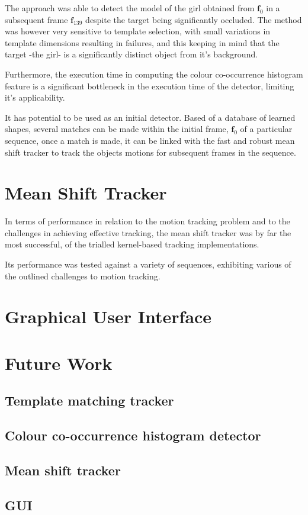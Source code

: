 The approach was able to detect the model of the girl obtained from
$\mathbf{f}_0$ in a subsequent frame $\mathbf{f}_{139}$ despite the target being
significantly occluded. 
The method was however very sensitive to template selection, with small
variations in template dimensions resulting in failures, and this keeping in
mind that the target -the girl- is a significantly distinct object from it's
background. 

Furthermore, the execution time in computing the colour co-occurrence histogram
feature is a significant bottleneck in the execution time of the detector,
limiting it's applicability. 

It has potential to be used as an initial detector. Based of a database of
learned shapes, several matches can be made within the initial frame,
$\mathbf{f}_0$ of a particular sequence, once a match is made, it can be linked
with the fast and robust mean shift tracker to track the objects motions for
subsequent frames in the sequence. 

\section{Mean Shift Tracker}
In terms of performance in relation to the motion tracking problem and to the
challenges in achieving effective tracking, the mean shift tracker was by far
the most successful, of the trialled kernel-based tracking implementations.

Its performance was tested against a variety of sequences, exhibiting various
of the outlined challenges to motion tracking.

\section{Graphical User Interface}


\section{Future Work}\label{future}
\subsection{Template matching tracker}
\subsection{Colour co-occurrence histogram detector}
\subsection{Mean shift tracker}
\subsection{GUI}
